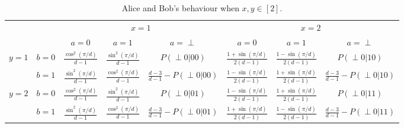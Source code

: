 \documentclass[11pt,letterpaper]{article}
\newcommand{\1}{\mathbb{1}}
\newcommand{\pr}[2]{P(#1|#2)}
\theoremstyle{definition}
\begin{document}
\begin{table}[H]
\begin{center}
\begin{tabular}{|c|c||c|c|c|c|c|c|}
\hline
\multicolumn{2}{|c|}{} &
\multicolumn{3}{|c|}{$x=1$}&
\multicolumn{3}{|c|}{$x=2$} \\
\cline{3-8}
\multicolumn{2}{|c|}{} &
$a = 0$ & $a=1$ & $a=\perp$ &
$a = 0$ & $a=1$ & $a=\perp$\\
\hline
\hline
\multirow{2}{*}{$y = 1$} & $b=0$ & $\frac{\cos^2(\pi/d)}{d-1}$ & $\frac{\sin^2(\pi/d)}{d-1}$ & \small $\pr{\perp0}{00}$ 
& $\frac{1+\sin(\pi/d)}{2(d-1)}$ & $\frac{1-\sin(\pi/d)}{2(d-1)}$ & \small  $\pr{\perp0}{10}$ \\
\cline{2-8}
&$b=1$ & $\frac{\sin^2(\pi/d)}{d-1}$ & $\frac{\cos^2(\pi/d)}{d-1}$ & $\frac{d-3}{d-1}-\pr{\perp0}{00}$ 
&  $\frac{1-\sin(\pi/d)}{2(d-1)}$ & $\frac{1+\sin(\pi/d)}{2(d-1)}$ & \small $\frac{d-3}{d-1} - \pr{\perp0}{10}$  \\
\hline
\multirow{2}{*}{$y = 2$} & $b=0$ & $\frac{\cos^2(\pi/d)}{d-1}$ & $\frac{\sin^2(\pi/d)}{d-1}$ & \small $\pr{\perp0}{01}$ & 
$ \frac{1-\sin(\pi/d)}{2(d-1)}$ & $ \frac{1+\sin(\pi/d)}{2(d-1)}$ & \small $\pr{\perp 0}{11}$  \\
\cline{2-8}
&$b=1$ & $\frac{\sin^2(\pi/d)}{d-1}$ & $\frac{\cos^2(\pi/d)}{d-1}$ & \small $\frac{d-3}{d-1}-\pr{\perp0}{01}$ &  
$ \frac{1+\sin(\pi/d)}{2(d-1)}$ & $ \frac{1-\sin(\pi/d)}{2(d-1)}$ & \small $\frac{d-3}{d-1}- \pr{\perp 0}{11}$ \\
\hline
\end{tabular}
\end{center}
\caption{Alice and Bob's behaviour when $x,y \in [2]$.}
\end{table}
\end{document}
